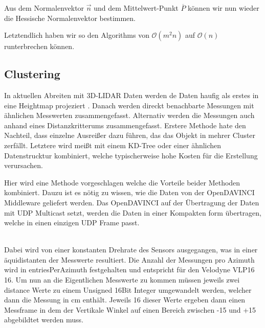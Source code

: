 \documentclass[11pt,oneside,openright]{mpreport}
\begin{document}
Aus dem Normalenvektor $\vec{n}$ und dem Mittelwert-Punkt $\overline{P}$ können wir nun wieder die Hessische Normalenvektor bestimmen.

Letztendlich haben wir so den Algorithms von $\mathcal{O}(m^2n) $ auf $\mathcal{O}(n) $ runterbrechen können.

\subsection{Clustering}
In aktuellen Abreiten mit 3D-LIDAR Daten werden de Daten haufig als erstes in eine Heightmap projeziert \cite{Zhang,Himmelsbach2009,Li2016}.
Danach werden direckt benachbarte Messungen mit ähnlichen Messwerten zusammengefasst. Alternativ werden die Messungen auch anhand eines Distanzkritterums 
zusammengefasst. Erstere Methode hate den Nachteil, dass einzelne Ausreißer dazu führen, das das Objekt in mehrer Cluster zerfällt.
Letztere wird meißt mit einem KD-Tree oder einer ähnlichen Datenstrucktur kombiniert, welche typischerweise hohe Kosten für die Erstellung verursachen.

Hier wird eine Methode vorgeschlagen welche die Vorteile beider Methoden kombiniert. Dauzu ist es nötig zu wissen, wie die Daten von der OpenDAVINCI 
Middleware geliefert werden. Das OpenDAVINCI auf der Übertragung der Daten mit UDP Multicast setzt, werden die Daten in einer Kompakten form übertragen, welche in einen einzigen
UDP Frame passt.\\
\begin{center}
\end{center}\\
Dabei wird von einer konstanten Drehrate des Sensors ausgegangen, was in einer äquidistanten der Messwerte resultiert. Die Anzahl der Messungen pro Azimuth
wird in entriesPerAzimuth festgehalten und entspricht für den Velodyne VLP16 16. Um nun an die Eigentlichen Messwerte zu kommen müssen jeweils zwei distance Werte zu
einem Unsigned 16Bit Integer umgewandelt werden, welcher dann die Messung in cm enthält. Jeweils 16 dieser Werte ergeben dann einen Messframe in dem der Vertikale Winkel
auf einen Bereich zwischen -15 und +15 abgebildtet werden muss.
\end{document}
